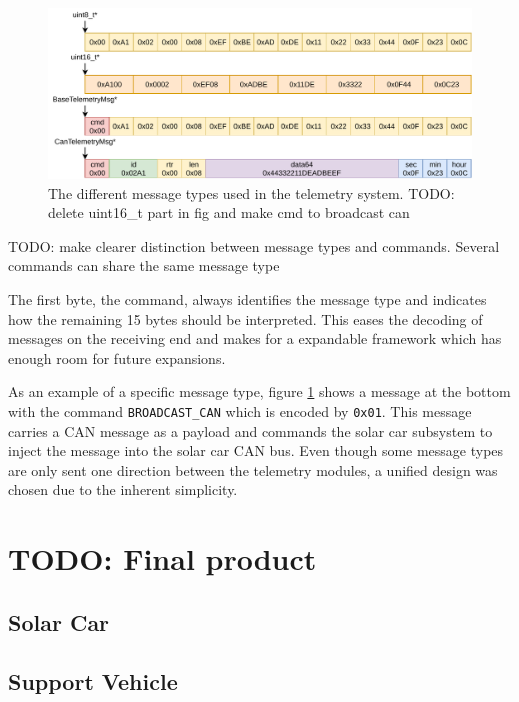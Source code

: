 \documentclass[conference]{IEEEtran}
\newcommand{\todo}[1]{{\color{olive} TODO: #1}}
\begin{document}
\begin{figure}
    \centering
    \includegraphics[width=\linewidth]{documentation/images/MessageTypes.pdf}
    \caption{The different message types used in the telemetry system.\todo{delete uint16\_t part in fig and make cmd to broadcast can}}
    \label{fig:messageTypes}
\end{figure}

\todo{make clearer distinction between message types and commands. Several commands can share the same message type}

The first byte, the command, always identifies the message type and indicates how the remaining 15 bytes should be interpreted. This eases the decoding of messages on the receiving end and makes for a expandable framework which has enough room for future expansions. 

As an example of a specific message type, figure \ref{fig:messageTypes} shows a message at the bottom with the command \texttt{BROADCAST\_CAN} which is encoded by \texttt{0x01}. This message carries a CAN message as a payload and commands the solar car subsystem to inject the message into the solar car CAN bus. Even though some message types are only sent one direction between the telemetry modules, a unified design was chosen due to the inherent simplicity.





\section{\todo{Final product}}
\subsection{Solar Car}
\subsection{Support Vehicle}
\end{document}
